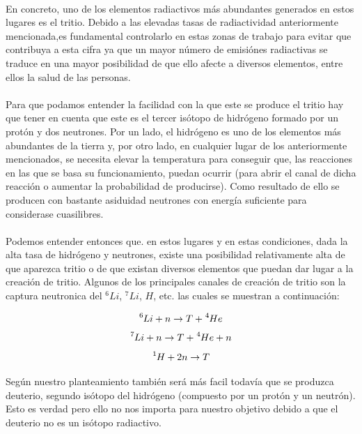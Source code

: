 \documentclass[11pt, a4paper]{article}
\begin{document}
\paragraph {}
En concreto, uno de los elementos radiactivos más abundantes generados en estos lugares es el tritio. Debido a las elevadas tasas de radiactividad anteriormente mencionada,es fundamental controlarlo en estas zonas de trabajo para evitar que contribuya a esta cifra ya que un mayor número de emisiónes radiactivas se traduce en una mayor posibilidad de que ello afecte a diversos elementos, entre ellos la salud de las personas.

\paragraph {}
Para que podamos entender la facilidad con la que este se produce el tritio hay que tener en cuenta que este es el tercer isótopo de hidrógeno formado por un protón y dos neutrones. Por un lado, el hidrógeno es uno de los elementos más abundantes de la tierra y, por otro lado, en cualquier lugar de los anteriormente mencionados, se necesita elevar la temperatura para conseguir que, las reacciones en las que se basa su funcionamiento, puedan ocurrir (para abrir el canal de dicha reacción o aumentar la probabilidad de producirse). Como resultado de ello se producen con bastante asiduidad neutrones con energía suficiente para considerase cuasilibres. 

\paragraph {}
Podemos entender entonces que. en estos lugares y en estas condiciones, dada la alta tasa de hidrógeno y neutrones, existe una posibilidad relativamente alta de que aparezca tritio o de que existan diversos elementos que puedan dar lugar a la creación de tritio. Algunos de los principales canales de creación de tritio son la captura neutronica del $^6Li$, $^7Li$, $H$, etc. las cuales se muestran a continuación:

$$\ce{^{6}{Li}} + n \rightarrow T + \ce{^{4}{He}}$$
$$\ce{^{7}{Li}} + n \rightarrow T + \ce{^{4}{He}} + n$$
$$\ce{^{1}{H}} + 2n \rightarrow T $$

Según nuestro planteamiento también será más facil todavía que se produzca deuterio, segundo isótopo del hidrógeno (compuesto por un protón y un neutrón). Esto es verdad pero ello no nos importa para nuestro objetivo debido a que el deuterio no es un isótopo radiactivo.
\end{document}
